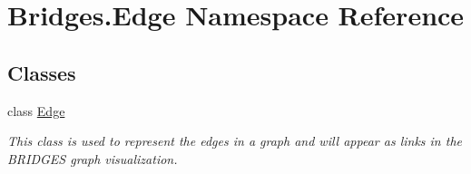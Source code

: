 \hypertarget{namespace_bridges_1_1_edge}{}\section{Bridges.\+Edge Namespace Reference}
\label{namespace_bridges_1_1_edge}
\subsection*{Classes}
\begin{DoxyCompactItemize}
\item 
class \mbox{\hyperlink{class_bridges_1_1_edge_1_1_edge}{Edge}}
\begin{DoxyCompactList}\small\item\em This class is used to represent the edges in a graph and will appear as links in the B\+R\+I\+D\+G\+ES graph visualization. \end{DoxyCompactList}\end{DoxyCompactItemize}
